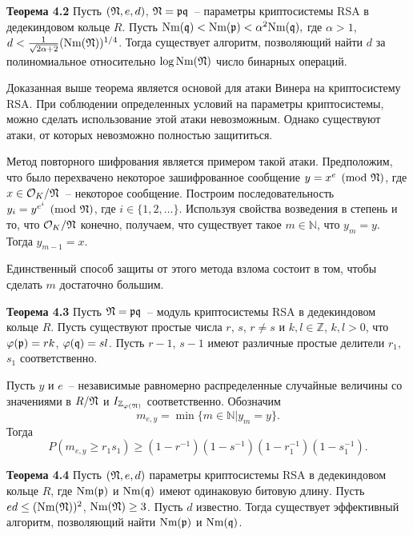\documentclass[_00_autoref.tex]{subfiles}
\begin{document}
\textbf{Теорема 4.2}\label{theorem:Wiener}
    Пусть $(\mathfrak{N}, e, d)$, $\mathfrak{N} = \mathfrak{p} \mathfrak{q}$~-- параметры криптосистемы RSA в дедекиндовом кольце $R$.
    Пусть $\textrm{Nm}(\mathfrak{q}) < \textrm{Nm}(\mathfrak{p}) < \alpha^2 \textrm{Nm}(\mathfrak{q}),$ где $\alpha > 1$, $d<\frac{1}{\sqrt{2\alpha+2}}(\textrm{Nm}(\mathfrak{N}))^{1/4}$.
    Тогда существует алгоритм, позволяющий найти $d$ за полиномиальное относительно $\log \textrm{Nm}(\mathfrak{N})$ число бинарных операций.

Доказанная выше теорема является основой для атаки Винера на криптосистему RSA.
При соблюдении определенных условий на параметры криптосистемы, можно сделать использование этой атаки невозможным.
Однако существуют атаки, от которых невозможно полностью защититься.

Метод повторного шифрования является примером такой атаки.
Предположим, что было перехвачено некоторое зашифрованное сообщение $y = x^e \pmod{\mathfrak{N}}$, где $x \in \mathcal{O}_K / \mathfrak{N}$~-- некоторое сообщение.
Построим последовательность $y_i = y^{e^i} \pmod{\mathfrak{N}}$, где $i \in \{1, 2, \ldots\}$.
Используя свойства возведения в степень и то, что $\mathcal{O}_K / \mathfrak{N}$ конечно, получаем, что существует такое $m \in \mathbb{N}$, что $y_m = y$.
Тогда $y_{m-1} = x$.

Единственный способ защиты от этого метода взлома состоит в том, чтобы сделать $m$ достаточно большим.

\textbf{Теорема 4.3}\label{theorem:iterated}
    Пусть $\mathfrak{N} = \mathfrak{p} \mathfrak{q}$~-- модуль криптосистемы RSA в дедекиндовом кольце $R$.
    Пусть существуют простые числа $r$, $s$, $r \neq s$ и $k, l \in \mathbb{Z}$, $k, l > 0$, что $\varphi(\mathfrak{p}) = rk$, $\varphi(\mathfrak{q}) = sl$.
    Пусть $r - 1$, $s - 1$ имеют различные простые делители $r_1$, $s_1$ соответственно.

    Пусть $y$ и $e$~-- независимые равномерно распределенные случайные величины со значениями в $R / \mathfrak{N}$ и $I_{\mathbb{Z}_{\varphi(\mathfrak{N})}}$ соответственно.
    Обозначим
    \begin{equation*}
        m_{e,y} = \min \{m \in \mathbb{N} | y_m = y\}.
    \end{equation*}
    Тогда
    \begin{equation*}
        P(m_{e,y} \ge r_1s_1)\ge(1-r^{-1})(1-s^{-1})(1-r_1^{-1})(1-s_1^{-1}).
    \end{equation*}

\textbf{Теорема 4.4}\label{theorem:d_is_known_2}
    Пусть $(\mathfrak{N}, e, d)$ параметры криптосистемы RSA в дедекиндовом кольце $R$, где $\textrm{Nm}(\mathfrak{p})$ и $\textrm{Nm}(\mathfrak{q})$ имеют одинаковую битовую длину.
    Пусть $e d \le (\textrm{Nm}(\mathfrak{N}))^2$, $\textrm{Nm}(\mathfrak{N}) \ge 3$.
    Пусть $d$ известно.
    Тогда существует эффективный алгоритм, позволяющий найти $\textrm{Nm}(\mathfrak{p})$ и $\textrm{Nm}(\mathfrak{q})$.
\end{document}
